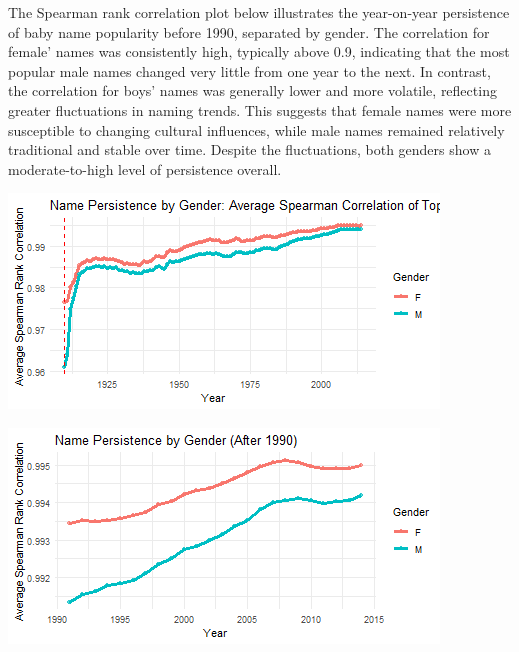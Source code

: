 \documentclass[11pt,preprint]{elsarticle}
\let\origfigure\figure
\let\endorigfigure\endfigure
\renewenvironment{figure}[1][2] {
    \expandafter\origfigure\expandafter[H]
} {
    \endorigfigure
}
\numberwithin{equation}{section}
\numberwithin{figure}{section}
\numberwithin{table}{section}
\begin{document}
The Spearman rank correlation plot below illustrates the year-on-year
persistence of baby name popularity before 1990, separated by gender.
The correlation for female' names was consistently high, typically above
0.9, indicating that the most popular male names changed very little
from one year to the next. In contrast, the correlation for boys' names
was generally lower and more volatile, reflecting greater fluctuations
in naming trends. This suggests that female names were more susceptible
to changing cultural influences, while male names remained relatively
traditional and stable over time. Despite the fluctuations, both genders
show a moderate-to-high level of persistence overall.

\begin{figure}[H]

{\centering \includegraphics{23034103_Q1USbabynames_files/figure-latex/Figure 1a-1}

}

\caption{Caption Here \label{Figure1}}\label{fig:Figure 1a-1}
\end{figure}
\begin{figure}[H]

{\centering \includegraphics{23034103_Q1USbabynames_files/figure-latex/Figure 1a-2}

}

\caption{Caption Here \label{Figure1}}\label{fig:Figure 1a-2}
\end{figure}
\end{document}
